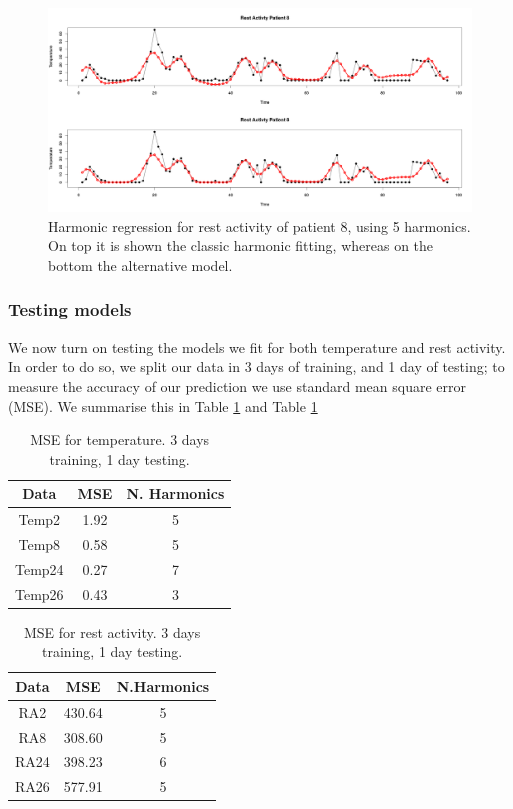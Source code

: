 \documentclass[]{article}
\begin{document}
\begin{figure}[htbp]\centering
	\includegraphics[scale = 0.22]{fit_rest_activty_Patient_8.png}
	\caption{Harmonic regression for rest activity of patient 8, using 5 harmonics. On top it is shown the classic harmonic fitting, whereas on the bottom the alternative model. }
	\label{fig:fit_restactivity.temp8}
\end{figure}


\subsubsection*{Testing models}
We now turn on testing the models we fit for both temperature and rest activity. In order to do so, we split our data in 3 days of training, and 1 day of testing; to measure the accuracy of our prediction we use standard mean square error (MSE). We summarise this in Table \ref{table:test.Temp} and Table \ref{table:test.Temp}

\begin{table}[htbp]
\begin{center}
\begin{tabular}{ ccc } 
 Data & MSE & N. Harmonics \\
  \hline
 Temp2 & 1.92 & 5 \\
 Temp8 & 0.58 & 5\\
 Temp24& 0.27 & 7\\
 Temp26& 0.43 & 3\\
\end{tabular}
\end{center}
\caption{MSE for temperature. 3 days training, 1 day testing.}
\label{table:test.Temp}
\end{table}


\begin{table}[htbp]
\begin{center}
\begin{tabular}{ ccc } 
 Data & MSE & N.Harmonics \\
  \hline
 RA2 & 430.64 & 5 \\
 RA8 & 308.60 & 5\\
 RA24& 398.23 & 6\\
 RA26& 577.91 & 5\\
\end{tabular}
\end{center}
\caption{MSE for rest activity. 3 days training, 1 day testing.}
\label{table:test.RA}
\end{table}
\end{document}
